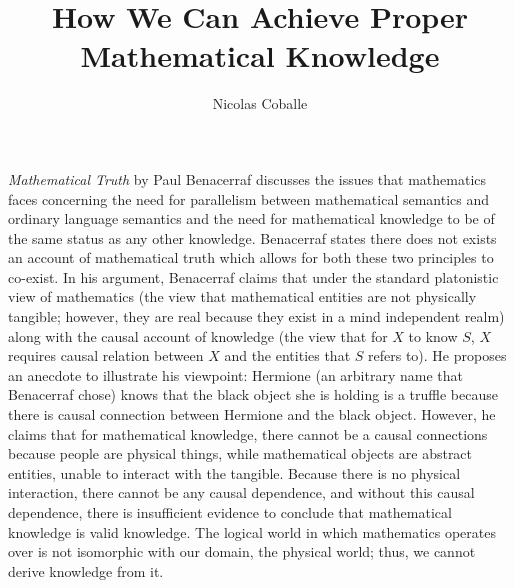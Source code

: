 \documentclass[11pt]{article}
\title{How We Can Achieve Proper Mathematical Knowledge}
\author{Nicolas Coballe}
\begin{document}
\doublespacing

\maketitle

\textit{Mathematical Truth} by Paul Benacerraf discusses the issues that mathematics faces concerning the need for parallelism between mathematical semantics and ordinary language semantics and the need for mathematical knowledge to be of the same status as any other knowledge. Benacerraf states there does not exists an account of mathematical truth which allows for both these two principles to co-exist. In his argument, Benacerraf claims that under the standard platonistic view of mathematics (the view that mathematical entities are not physically tangible; however, they are real because they exist in a mind independent realm) along with the causal account of knowledge (the view that for $X$ to know $S$, $X$ requires causal relation between $X$ and the entities that $S$ refers to). He proposes an anecdote to illustrate his viewpoint: Hermione (an arbitrary name that Benacerraf chose) knows that the black object she is holding is a truffle because there is causal connection between Hermione and the black object. However, he claims that for mathematical knowledge, there cannot be a causal connections because people are physical things, while mathematical objects are abstract entities, unable to interact with the tangible. Because there is no physical interaction, there cannot be any causal dependence, and without this causal dependence, there is insufficient evidence to conclude that mathematical knowledge is valid knowledge. The logical world in which mathematics operates over is not isomorphic with our domain, the physical world; thus, we cannot derive knowledge from it.
\end{document}

